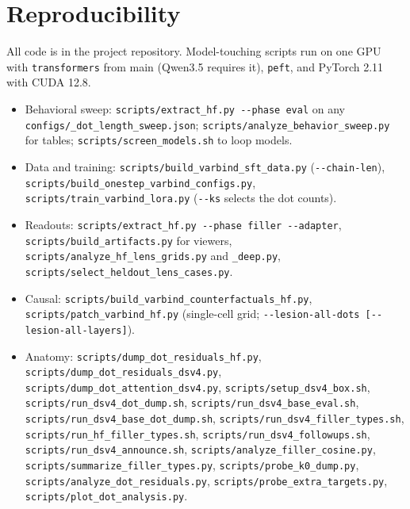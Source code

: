 \documentclass[11pt]{article}
\newcommand{\ttt}[1]{\texttt{\small #1}}
\begin{document}
\section{Reproducibility}
\begin{raggedright}

All code is in the project repository. Model-touching scripts run on one GPU with \ttt{transformers} from main (Qwen3.5 requires it), \ttt{peft}, and PyTorch 2.11 with CUDA 12.8.

\begin{itemize}
\item Behavioral sweep: \ttt{scripts/\allowbreak extract\_hf.py -{}-phase eval} on any \ttt{configs/\allowbreak *\_dot\_length\_sweep.json}; \ttt{scripts/\allowbreak analyze\_behavior\_sweep.py} for tables; \ttt{scripts/\allowbreak screen\_models.sh} to loop models.
\item Data and training: \ttt{scripts/\allowbreak build\_varbind\_sft\_data.py} (\ttt{-{}-chain-len}), \ttt{scripts/\allowbreak build\_onestep\_varbind\_configs.py}, \ttt{scripts/\allowbreak train\_varbind\_lora.py} (\ttt{-{}-ks} selects the dot counts).
\item Readouts: \ttt{scripts/\allowbreak extract\_hf.py -{}-phase filler -{}-adapter}, \ttt{scripts/\allowbreak build\_artifacts.py} for viewers, \ttt{scripts/\allowbreak analyze\_hf\_lens\_grids.py} and \ttt{\_deep.py}, \ttt{scripts/\allowbreak select\_heldout\_lens\_cases.py}.
\item Causal: \ttt{scripts/\allowbreak build\_varbind\_counterfactuals\_hf.py}, \ttt{scripts/\allowbreak patch\_varbind\_hf.py} (single-cell grid; \ttt{-{}-lesion-all-dots [-{}-lesion-all-layers]}).
\item Anatomy: \ttt{scripts/\allowbreak dump\_dot\_residuals\_hf.py}, \ttt{scripts/\allowbreak dump\_dot\_residuals\_dsv4.py}, \ttt{scripts/\allowbreak dump\_dot\_attention\_dsv4.py}, \ttt{scripts/\allowbreak setup\_dsv4\_box.sh}, \ttt{scripts/\allowbreak run\_dsv4\_dot\_dump.sh}, \ttt{scripts/\allowbreak run\_dsv4\_base\_eval.sh}, \ttt{scripts/\allowbreak run\_dsv4\_base\_dot\_dump.sh}, \ttt{scripts/\allowbreak run\_dsv4\_filler\_types.sh}, \ttt{scripts/\allowbreak run\_hf\_filler\_types.sh}, \ttt{scripts/\allowbreak run\_dsv4\_followups.sh}, \ttt{scripts/\allowbreak run\_dsv4\_announce.sh}, \ttt{scripts/\allowbreak analyze\_filler\_cosine.py}, \ttt{scripts/\allowbreak summarize\_filler\_types.py}, \ttt{scripts/\allowbreak probe\_k0\_dump.py}, \ttt{scripts/\allowbreak analyze\_dot\_residuals.py}, \ttt{scripts/\allowbreak probe\_extra\_targets.py}, \ttt{scripts/\allowbreak plot\_dot\_analysis.py}.

\end{itemize}
\end{raggedright}
\end{document}
